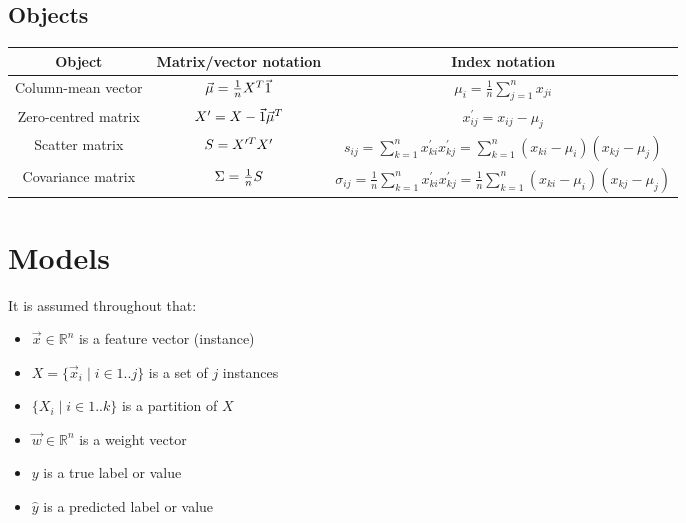 \documentclass[a4paper]{extarticle}
\begin{document}
\begin{landscape}
  \section{Objects}

  \begin{center}
    \begin{tabular}
      {ccc}
      Object
       & Matrix/vector notation
       & Index notation                                                                                                                                    \\
      \hline
      Column-mean vector
       & $\vec{\mu} = \frac{1}{n} X^{T} \vec{1}$
       & $\mu_{i} = \frac{1}{n} \sum_{j = 1}^{n} x_{ji}$                                                                                                   \\
      Zero-centred matrix
       & $X^{\prime} = X - \vec{1} \vec{\mu}^{T}$
       & $x_{ij}^{\prime} = x_{ij} - \mu_{j}$                                                                                                              \\
      Scatter matrix
       & $S = X^{\prime T} X^{\prime}$
       & $s_{ij} = \sum_{k = 1}^{n} x_{ki}^{\prime} x_{kj}^{\prime} = \sum_{k = 1}^{n} (x_{ki} - \mu_{i}) (x_{kj} - \mu_{j}) $                             \\
      Covariance matrix
       & $\Sigma = \frac{1}{n} S$
       & $\sigma_{ij} = \frac{1}{n} \sum_{k = 1}^{n} x_{ki}^{\prime} x_{kj}^{\prime} = \frac{1}{n} \sum_{k = 1}^{n} (x_{ki} - \mu_{i}) (x_{kj} - \mu_{j})$ \\
    \end{tabular}
  \end{center}
\end{landscape}

\section{Models}

It is assumed throughout that:

\begin{itemize}
  \item $\vec{x} \in \mathbb{R}^{n}$ is a feature vector (instance)
  \item $X = \{ \vec{x}_{i} \mid i \in 1 .. j \}$ is a set of $j$ instances
  \item $\{ X_{i} \mid i \in 1 .. k \}$ is a partition of $X$
  \item $\vec{w} \in \mathbb{R}^{n}$ is a weight vector
  \item $y$ is a true label or value
  \item $\hat{y}$ is a predicted label or value
\end{itemize}
\end{document}
